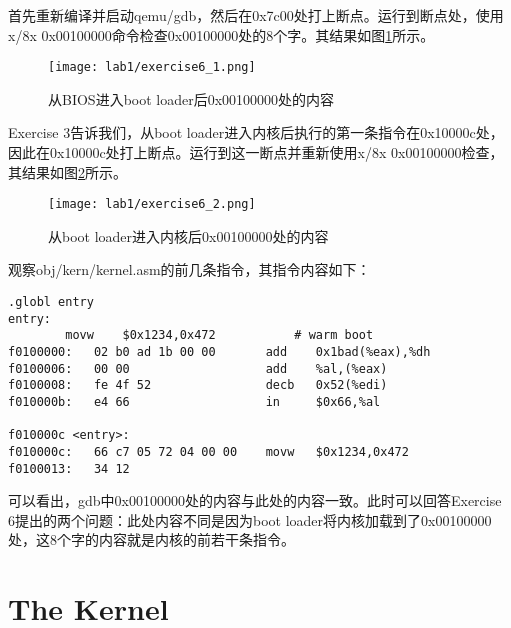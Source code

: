 
\begin{exerciseSolution}{6}
\par 首先重新编译并启动qemu/gdb，然后在0x7c00处打上断点。运行到断点处，使用x/8x 0x00100000命令检查0x00100000处的8个字。其结果如图\ref{fig:exercise6_1}所示。
\begin{figure}[htb]
    \centering
    \texttt{[image: lab1/exercise6\_1.png]}
    \caption{从BIOS进入boot loader后0x00100000处的内容}
    \label{fig:exercise6_1}
\end{figure}

\par Exercise 3告诉我们，从boot loader进入内核后执行的第一条指令在0x10000c处，因此在0x10000c处打上断点。运行到这一断点并重新使用x/8x 0x00100000检查，其结果如图\ref{fig:exercise6_2}所示。
\begin{figure}[htb]
    \centering
    \texttt{[image: lab1/exercise6\_2.png]}
    \caption{从boot loader进入内核后0x00100000处的内容}
    \label{fig:exercise6_2}
\end{figure}

\FloatBarrier
\par 观察obj/kern/kernel.asm的前几条指令，其指令内容如下：
\begin{lstlisting}
.globl entry
entry:
        movw	$0x1234,0x472			# warm boot
f0100000:	02 b0 ad 1b 00 00    	add    0x1bad(%eax),%dh
f0100006:	00 00                	add    %al,(%eax)
f0100008:	fe 4f 52             	decb   0x52(%edi)
f010000b:	e4 66                	in     $0x66,%al

f010000c <entry>:
f010000c:	66 c7 05 72 04 00 00 	movw   $0x1234,0x472
f0100013:	34 12
\end{lstlisting}
\par 可以看出，gdb中0x00100000处的内容与此处的内容一致。此时可以回答Exercise 6提出的两个问题：此处内容不同是因为boot loader将内核加载到了0x00100000处，这8个字的内容就是内核的前若干条指令。
\end{exerciseSolution}

\FloatBarrier
\section{The Kernel}
